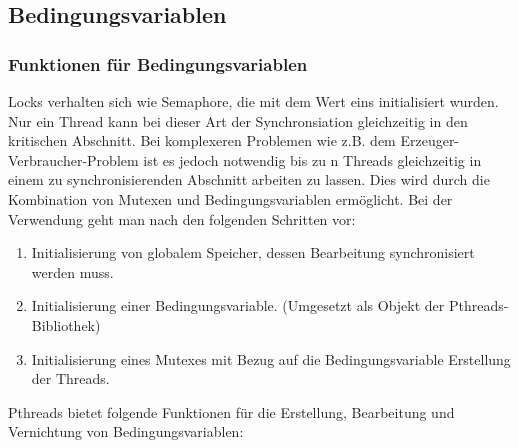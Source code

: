 \documentclass[11pt,a4paper]{article}
\begin{document}
\subsection{Bedingungsvariablen}

\subsubsection{Funktionen für Bedingungsvariablen}

Locks verhalten sich wie Semaphore, die mit dem Wert eins initialisiert wurden. Nur ein Thread kann bei dieser Art der Synchronsiation gleichzeitig in den kritischen Abschnitt. Bei komplexeren Problemen wie z.B. dem Erzeuger-Verbraucher-Problem ist es jedoch notwendig bis zu n Threads gleichzeitig in einem zu synchronisierenden Abschnitt arbeiten zu lassen. Dies wird durch die Kombination von Mutexen und Bedingungsvariablen ermöglicht. Bei der Verwendung geht man nach den folgenden Schritten vor:

\begin{enumerate}
	\item Initialisierung von globalem Speicher, dessen Bearbeitung synchronisiert werden muss.
	\item Initialisierung einer Bedingungsvariable. (Umgesetzt als Objekt der Pthreads-Bibliothek) 
	\item Initialisierung eines Mutexes mit Bezug auf die Bedingungsvariable Erstellung der Threads.
\end{enumerate}

Pthreads bietet folgende Funktionen für die Erstellung, Bearbeitung und Vernichtung von Bedingungsvariablen:
\end{document}
